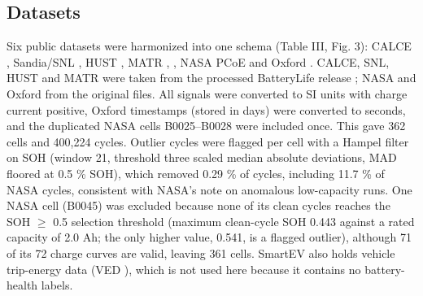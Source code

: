 \documentclass[journal]{IEEEtran}
\begin{document}
\subsection{Datasets}
Six public datasets were harmonized into one schema (Table III, Fig. 3): CALCE \cite{b10}, Sandia/SNL \cite{b25}, HUST \cite{b26}, MATR \cite{b8}, \cite{b27}, NASA PCoE \cite{b9} and Oxford \cite{b11}. CALCE, SNL, HUST and MATR were taken from the processed BatteryLife release \cite{b24}; NASA and Oxford from the original files. All signals were converted to SI units with charge current positive, Oxford timestamps (stored in days) were converted to seconds, and the duplicated NASA cells B0025--B0028 were included once. This gave 362 cells and 400,224 cycles. Outlier cycles were flagged per cell with a Hampel filter on SOH (window 21, threshold three scaled median absolute deviations, MAD floored at 0.5 \% SOH), which removed 0.29 \% of cycles, including 11.7 \% of NASA cycles, consistent with NASA's note on anomalous low-capacity runs. One NASA cell (B0045) was excluded because none of its clean cycles reaches the SOH $\ge$ 0.5 selection threshold (maximum clean-cycle SOH 0.443 against a rated capacity of 2.0 Ah; the only higher value, 0.541, is a flagged outlier), although 71 of its 72 charge curves are valid, leaving 361 cells. SmartEV also holds vehicle trip-energy data (VED \cite{b28}), which is not used here because it contains no battery-health labels.
\end{document}
